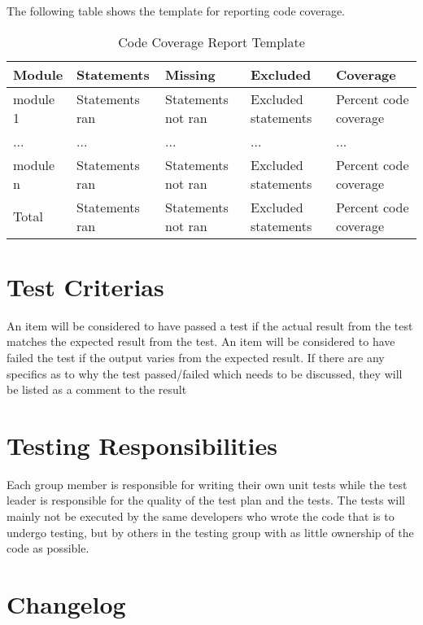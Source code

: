 The following table shows the template for reporting code coverage.

\begin{table}[!htb]\footnotesize\center
	\caption{Code Coverage Report Template\label{tab:TestCoverageReport}}
	\begin{tabular}{l l l l l}
		\toprule
		Module & Statements & Missing & Excluded & Coverage\\
		\midrule
		module 1 & Statements ran & Statements not ran  & Excluded statements & Percent code coverage\ \\
		... & ... & ... & ... & ... \\
		module n & Statements ran & Statements not ran & Excluded statements  & Percent code coverage \\
		\bottomrule
		Total & Statements ran & Statements not ran & Excluded statements & Percent code coverage \\
		\bottomrule
	\end{tabular}
\end{table}


\section{Test Criterias}
An item will be considered to have passed a test if the actual result from the test matches the expected result from the test. An item will be considered to have failed the test if the output varies from the expected result. If there are any specifics as to why the test passed/failed which needs to be discussed, they will be listed as a comment to the result


\section{Testing Responsibilities}
Each group member is responsible for writing their own unit tests while the test leader is responsible for the quality of the test plan and the tests. The tests will mainly not be executed by the same developers who wrote the code that is to undergo testing, but by others in the testing group with as little ownership of the code as possible. 

\section{Changelog}

